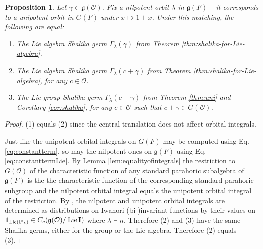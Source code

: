 \documentclass{amsart}
\numberwithin{equation}{section}
\newtheorem{proposition}[lemma]{Proposition}%
\theoremstyle{definition}
\newtheorem{remark}[lemma]{Remark}%
\def\16{{\bf 16}}
\def\1{{\bf 1}}
\DeclareMathOperator{\Lie}{Lie}
\newcommand{\cO}{\mathcal{O}}
\newcommand{\fg}{\mathfrak{g}}
\newcommand{\bP}{\mathbf{P}}
\newcommand{\bI}{\mathbf{I}}
\DeclareMathOperator{\cchar}{\text{char}}
\begin{document}
\begin{proposition}
\label{prop:germcomparison}
Let $\gamma\in\fg(\cO)$. Fix a nilpotent orbit $\lambda$ in $\fg(F)$ -- it corresponds to a unipotent orbit in $G(F)$ under $x\mapsto 1+x$.
Under this matching, the following are equal:
\begin{enumerate}
\item The Lie algebra Shalika germ $\Gamma_{\lambda}(\gamma)$ from Theorem \ref{thm:shalika-for-Lie-algebra}.
\item The Lie algebra Shalika germ $\Gamma_{\lambda}(c+\gamma)$ from Theorem \ref{thm:shalika-for-Lie-algebra}, for any $c\in\cO$.
\item The Lie group Shalika germ $\Gamma_{\lambda}(c+\gamma)$ from Theorem \ref{thm:uni} and Corollary \ref{cor:shalika}, for any $c\in\cO$ such that $c+\gamma\in G(\cO)$.
\end{enumerate}
\end{proposition}
\begin{proof}
(1) equals (2) since the central translation does not affect orbital integrals.

Just like the unipotent orbital integrals on $G(F)$ may be computed using Eq. \eqref{eq:constantterm}, so may the nilpotent ones on $\fg(F)$ using Eq. \eqref{eq:constanttermLie}. By Lemma \ref{lem:equalityofintegrals} the  restriction to $G(\cO)$ of the characteristic function of any standard parahoric subalgebra of $\fg(F)$ is the the characteristic function of the corresponding standard parahoric subgroup and the nilpotent orbital integral equals the unipotent orbital integral of the restriction.
By \cite[Corollaire 4.4.]{W1}, the nilpotent and unipotent orbital integrals are determined as distributions on Iwahori-(bi-)invariant functions by their values on $\1_{\Lie(\bP_\lambda)}\in C_c(\fg(\cO)/\Lie \bI)$ where $\lambda\vdash n$. Therefore (2) and (3) have the same Shalika germs, either for the group or the Lie algebra. Therefore (2) equals (3).\end{proof}

\end{document}
